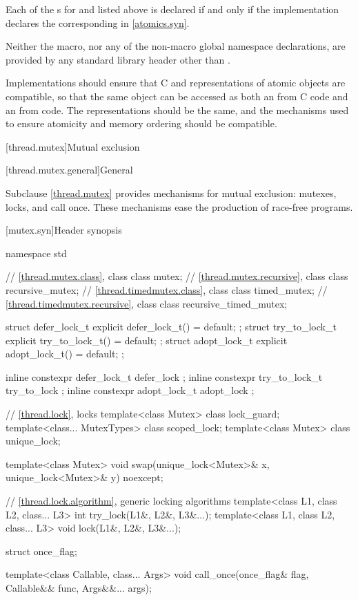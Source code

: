 \pnum
Each of the s for
 and 
listed above is declared if and only if the implementation declares
the corresponding  in \ref{atomics.syn}.

\pnum
Neither the  macro,
nor any of the non-macro global namespace declarations,
are provided by any \Cpp{} standard library header
other than .

\pnum
\recommended
Implementations should ensure
that C and \Cpp{} representations of atomic objects are compatible,
so that the same object can be accessed as both an 
from C code and an  from \Cpp{} code.
The representations should be the same, and
the mechanisms used to ensure atomicity and memory ordering
should be compatible.

[thread.mutex]{Mutual exclusion}

[thread.mutex.general]{General}

\pnum
Subclause \ref{thread.mutex} provides mechanisms for mutual exclusion: mutexes, locks, and call
once. These mechanisms ease the production of race-free
programs.

[mutex.syn]{Header  synopsis}

%
\begin{codeblock}
namespace std {
  // \ref{thread.mutex.class}, class 
  class mutex;
  // \ref{thread.mutex.recursive}, class 
  class recursive_mutex;
  // \ref{thread.timedmutex.class}, class 
  class timed_mutex;
  // \ref{thread.timedmutex.recursive}, class 
  class recursive_timed_mutex;

  struct defer_lock_t { explicit defer_lock_t() = default; };
  struct try_to_lock_t { explicit try_to_lock_t() = default; };
  struct adopt_lock_t { explicit adopt_lock_t() = default; };

  inline constexpr defer_lock_t  defer_lock { };
  inline constexpr try_to_lock_t try_to_lock { };
  inline constexpr adopt_lock_t  adopt_lock { };

  // \ref{thread.lock}, locks
  template<class Mutex> class lock_guard;
  template<class... MutexTypes> class scoped_lock;
  template<class Mutex> class unique_lock;

  template<class Mutex>
    void swap(unique_lock<Mutex>& x, unique_lock<Mutex>& y) noexcept;

  // \ref{thread.lock.algorithm}, generic locking algorithms
  template<class L1, class L2, class... L3> int try_lock(L1&, L2&, L3&...);
  template<class L1, class L2, class... L3> void lock(L1&, L2&, L3&...);

  struct once_flag;

  template<class Callable, class... Args>
    void call_once(once_flag& flag, Callable&& func, Args&&... args);
}
\end{codeblock}

